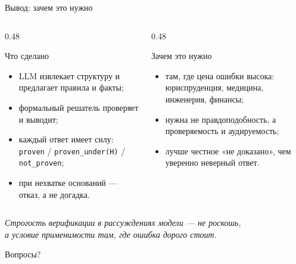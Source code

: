 \documentclass[aspectratio=169,11pt]{beamer}
\newcommand{\Hyp}[1]{\textcolor{hypocolor}{#1}}
\newcommand{\Prov}[1]{\textcolor{provencolor}{#1}}
\begin{document}
\begin{frame}[shrink=2]{Вывод: зачем это нужно}
  \small
  \begin{columns}[T,onlytextwidth]
    \begin{column}{0.48\textwidth}
      \begin{block}{Что сделано}
        \begin{itemize}
          \item LLM извлекает структуру и предлагает правила и факты;
          \item формальный решатель проверяет и выводит;
          \item каждый ответ имеет силу: \Prov{\texttt{proven}} /
                \Hyp{\texttt{proven\_under(H)}} / \texttt{not\_proven};
          \item при нехватке оснований --- отказ, а не догадка.
        \end{itemize}
      \end{block}
    \end{column}
    \begin{column}{0.48\textwidth}
      \begin{block}{Зачем это нужно}
        \begin{itemize}
          \item там, где цена ошибки высока: юриспруденция, медицина,
                инженерия, финансы;
          \item нужна не правдоподобность, а проверяемость и аудируемость;
          \item лучше честное «не доказано», чем уверенно неверный ответ.
        \end{itemize}
      \end{block}
    \end{column}
  \end{columns}

  \vspace{4mm}
  \begin{center}
    \large\itshape
    Строгость верификации в рассуждениях модели --- не роскошь,\\
    а условие применимости там, где ошибка дорого стоит.
  \end{center}

  \vspace{3mm}
  \begin{center}
    Вопросы?
  \end{center}
\end{frame}
\end{document}
